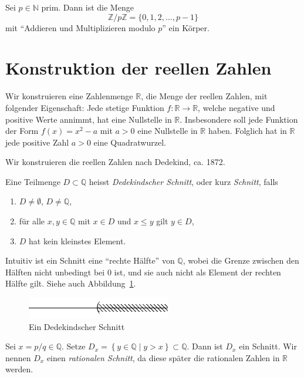 \documentclass[../main.tex]{subfiles}
\begin{document}
\begin{ausblick}[Algebra]
  Sei $p \in \mathbb N$ prim. Dann ist die Menge
  \[ \mathbb Z / p \mathbb Z = \{0, 1, 2, \dots, p-1\}\]
  mit ``Addieren und Multiplizieren modulo $p$'' ein Körper.
\end{ausblick}

\section{Konstruktion der reellen Zahlen}
\begin{goal}
  Wir konstruieren eine Zahlenmenge $\mathbb R$,
  die Menge der reellen Zahlen, mit folgender
  Eigenschaft: Jede stetige Funktion $f \colon \mathbb R \to \mathbb R$,
  welche negative und positive Werte annimmt, hat eine Nullstelle
  in $\mathbb R$. Insbesondere soll jede Funktion
  der Form $f(x)=x^{2}-a$ mit $a>0$ eine Nullstelle in $\mathbb R$
  haben. Folglich hat in $\mathbb R$ jede positive Zahl
  $a > 0$ eine Quadratwurzel.
\end{goal}

Wir konstruieren die reellen Zahlen nach Dedekind, ca. 1872.
\begin{definition}
  Eine Teilmenge $D \subset \mathbb Q$ heisst
  \emph{Dedekindscher Schnitt}, oder kurz \emph{Schnitt},
  falls
  \begin{enumerate}[(1)]
    \item $D \neq \emptyset$, $D \neq \mathbb Q$,
    \item für alle $x, y \in \mathbb Q$ mit $x \in D$ und $x \leq y$ gilt $y \in D$,
    \item $D$ hat kein kleinstes Element.
  \end{enumerate}
\end{definition}

Intuitiv ist ein Schnitt eine ``rechte Hälfte'' von $\mathbb Q$, wobei
die Grenze
zwischen den Hälften
nicht unbedingt bei $0$ ist, und sie auch nicht als Element der
rechten Hälfte gilt. Siehe auch Abbildung~\ref{fig:schnitt}.

\begin{figure}[htb]
  \centering
  \includegraphics{images/dedekind-schnitt}
  \caption{Ein Dedekindscher Schnitt}%
  \label{fig:schnitt}
\end{figure}

\begin{example}
  Sei $x = p/q \in \mathbb Q$. Setze $D_{x} = \left\{y \in \mathbb Q \mid y > x\right\}
  \subset \mathbb Q$.
  Dann ist $D_{x}$ ein Schnitt. Wir nennen $D_{x}$ einen \emph{rationalen Schnitt},
  da diese später die rationalen Zahlen in $\mathbb R$ werden.
\end{example}
\end{document}
